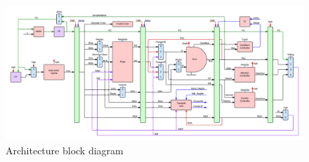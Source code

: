 \begin{figure}[H]

  \centering
  \includegraphics[width=\textwidth]{fpga/fig/fitness_core.png}
  \caption{Architecture block diagram}
  \label{fpga:fig:fitness:fitness_arch}
\end{figure}
